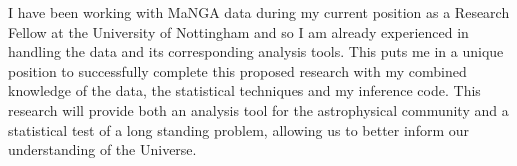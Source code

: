 \documentclass[11pt]{article}
\begin{document}
I have been working with MaNGA data during my current position as a Research Fellow at the University of Nottingham and so I am already experienced in handling the data and its corresponding analysis tools. This puts me in a unique position to successfully complete this proposed research with my combined knowledge of the data, the statistical techniques and my inference code. This research will provide both an analysis tool for the astrophysical community and a statistical test of a long standing 	problem, allowing us to better inform our understanding of the Universe.




\vspace{-0.5em}
\end{document}
